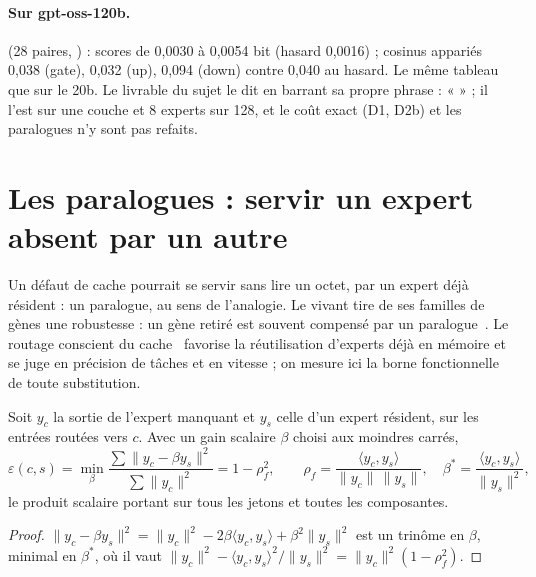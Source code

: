 \paragraph{Sur gpt-oss-120b.}  (28 paires, ) \mes : scores de 0,0030 à 0,0054 bit (hasard 0,0016) ; cosinus appariés 0,038 (gate), 0,032 (up), 0,094 (down) contre 0,040 au hasard. Le même tableau que sur le 20b. Le livrable du sujet le dit en barrant sa propre phrase : «  » ; il l'est sur une couche et 8 experts sur 128, et le coût exact (D1, D2b) et les paralogues n'y sont pas refaits.

\section{Les paralogues : servir un expert absent par un autre}\label{t3dup:sec:paralogues}

Un défaut de cache pourrait se servir sans lire un octet, par un expert déjà résident : un paralogue, au sens de l'analogie. Le vivant tire de ses familles de gènes une robustesse : un gène retiré est souvent compensé par un paralogue~\cite{gu2003duplicate}. Le routage conscient du cache~\cite{skliar2024cacheconditional} favorise la réutilisation d'experts déjà en mémoire et se juge en précision de tâches et en vitesse ; on mesure ici la borne fonctionnelle de toute substitution.

\begin{lemme}\label{t3dup:lem:paralogue}
Soit $y_c$ la sortie de l'expert manquant et $y_s$ celle d'un expert résident, sur les entrées routées vers $c$. Avec un gain scalaire $\beta$ choisi aux moindres carrés,
\begin{equation}\label{t3dup:eq:paralogue}
\varepsilon(c, s) = \min_\beta \frac{\sum\|y_c - \beta y_s\|^2}{\sum\|y_c\|^2} = 1 - \rho_f^2, \qquad \rho_f = \frac{\langle y_c, y_s\rangle}{\|y_c\|\,\|y_s\|},\quad \beta^\ast = \frac{\langle y_c, y_s\rangle}{\|y_s\|^2},
\end{equation}
le produit scalaire portant sur tous les jetons et toutes les composantes.
\end{lemme}

\begin{proof}
$\|y_c - \beta y_s\|^2 = \|y_c\|^2 - 2\beta\langle y_c, y_s\rangle + \beta^2\|y_s\|^2$ est un trinôme en $\beta$, minimal en $\beta^\ast$, où il vaut $\|y_c\|^2 - \langle y_c, y_s\rangle^2/\|y_s\|^2 = \|y_c\|^2(1 - \rho_f^2)$.
\end{proof}

